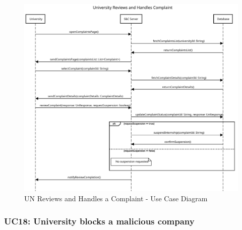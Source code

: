 \begin{figure}[H]
    \centering
    \includegraphics[width=1.0\textwidth]{Images/UC_16.pdf}
    \caption{UN Reviews and Handles a Complaint - Use Case Diagram}
    \label{fig:use-case-diagram-17}
\end{figure}


\subsubsection{UC18: University blocks a malicious company}
\label{subsubsec:university-blocks-a-malicious-company}

